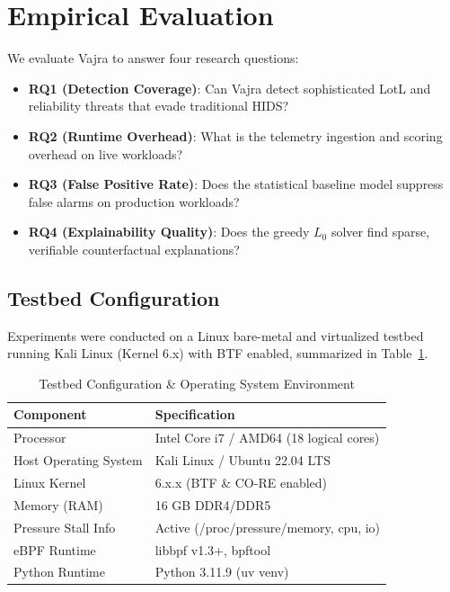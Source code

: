 \documentclass[conference]{IEEEtran}
\begin{document}
\section{Empirical Evaluation}
\label{sec:eval}
We evaluate Vajra to answer four research questions:
\begin{itemize}
    \item \textbf{RQ1 (Detection Coverage)}: Can Vajra detect sophisticated LotL and reliability threats that evade traditional HIDS?
    \item \textbf{RQ2 (Runtime Overhead)}: What is the telemetry ingestion and scoring overhead on live workloads?
    \item \textbf{RQ3 (False Positive Rate)}: Does the statistical baseline model suppress false alarms on production workloads?
    \item \textbf{RQ4 (Explainability Quality)}: Does the greedy $L_0$ solver find sparse, verifiable counterfactual explanations?
\end{itemize}

\subsection{Testbed Configuration}
Experiments were conducted on a Linux bare-metal and virtualized testbed running Kali Linux (Kernel 6.x) with BTF enabled, summarized in Table~\ref{tab:testbed}.

\begin{table}[h]
\centering
\caption{Testbed Configuration \& Operating System Environment}
\label{tab:testbed}
\begin{tabular}{@{}ll@{}}
\toprule
\textbf{Component} & \textbf{Specification} \\ \midrule
Processor & Intel Core i7 / AMD64 (18 logical cores) \\
Host Operating System & Kali Linux / Ubuntu 22.04 LTS \\
Linux Kernel & 6.x.x (BTF \& CO-RE enabled) \\
Memory (RAM) & 16 GB DDR4/DDR5 \\
Pressure Stall Info & Active (/proc/pressure/memory, cpu, io) \\
eBPF Runtime & libbpf v1.3+, bpftool \\
Python Runtime & Python 3.11.9 (uv venv) \\ \bottomrule
\end{tabular}
\end{table}
\end{document}
